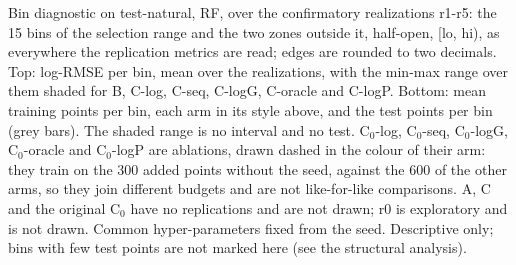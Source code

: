 Bin diagnostic on test-natural, RF, over the confirmatory realizations r1-r5: the 15 bins of the selection range and the two zones outside it, half-open, [lo, hi), as everywhere the replication metrics are read; edges are rounded to two decimals. Top: log-RMSE per bin, mean over the realizations, with the min-max range over them shaded for B, C-log, C-seq, C-logG, C-oracle and C-logP. Bottom: mean training points per bin, each arm in its style above, and the test points per bin (grey bars). The shaded range is no interval and no test. C$_0$-log, C$_0$-seq, C$_0$-logG, C$_0$-oracle and C$_0$-logP are ablations, drawn dashed in the colour of their arm: they train on the 300 added points without the seed, against the 600 of the other arms, so they join different budgets and are not like-for-like comparisons. A, C and the original C$_0$ have no replications and are not drawn; r0 is exploratory and is not drawn. Common hyper-parameters fixed from the seed. Descriptive only; bins with few test points are not marked here (see the structural analysis).
